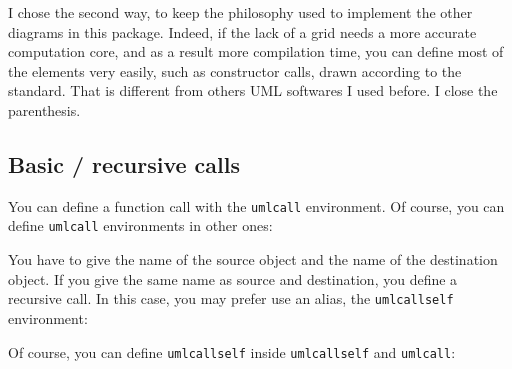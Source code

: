 \documentclass[a4paper,11pt]{report}
\begin{document}
I chose the second way, to keep the philosophy used to implement the other diagrams in this package. Indeed, if the lack of a grid needs a more accurate computation core, and as a result more compilation time, you can define most of the elements very easily, such as constructor calls, drawn according to the standard. That is different from others UML softwares I used before. I close the parenthesis.

\subsection{Basic / recursive calls}\label{ss.call}

You can define a function call with the {\tt umlcall} environment. Of course, you can define {\tt umlcall} environments in other ones:

\medskip

\begin{minipage}{0.4\textwidth}

\end{minipage}
\begin{minipage}{0.6\textwidth}
\begin{center}
\end{center}
\end{minipage}

\medskip

You have to give the name of the source object and the name of the destination object. If you give the same name as source and destination, you define a recursive call. In this case, you may prefer use an alias, the {\tt umlcallself} environment:

\medskip

\begin{minipage}{0.5\textwidth}

\end{minipage}
\begin{minipage}{0.5\textwidth}
\begin{center}
\end{center}
\end{minipage}

\medskip

Of course, you can define {\tt umlcallself} inside {\tt umlcallself} and {\tt umlcall}:

\medskip

\begin{minipage}{0.5\textwidth}

\end{minipage}
\begin{minipage}{0.5\textwidth}
\begin{center}
\end{center}
\end{minipage}
\end{document}
